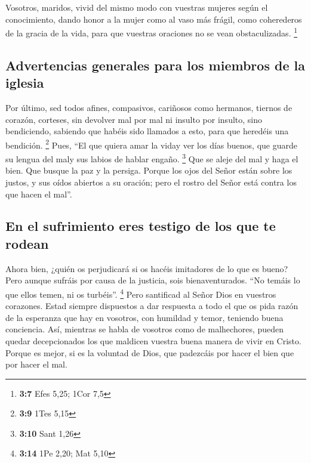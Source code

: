 \begin{paracol}{2}
 Vosotros, maridos, vivid del mismo modo con vuestras
mujeres según el conocimiento, dando honor a la mujer como al vaso más
frágil, como coherederos de la gracia de la vida, para que vuestras
oraciones no se vean obstaculizadas. \footnote{\textbf{3:7} Efes 5,25;
  1Cor 7,5}

\hypertarget{advertencias-generales-para-los-miembros-de-la-iglesia}{%
\subsection{Advertencias generales para los miembros de la
iglesia}\label{advertencias-generales-para-los-miembros-de-la-iglesia}}

 Por último, sed todos afines, compasivos, cariñosos como
hermanos, tiernos de corazón, corteses,  sin devolver mal
por mal ni insulto por insulto, sino bendiciendo, sabiendo que habéis
sido llamados a esto, para que heredéis una bendición. \footnote{\textbf{3:9}
  1Tes 5,15}  Pues, ``El que quiera amar la viday ver los
días buenos, que guarde su lengua del maly sus labios de hablar engaño.
\footnote{\textbf{3:10} Sant 1,26}  Que se aleje del mal
y haga el bien. Que busque la paz y la persiga.  Porque
los ojos del Señor están sobre los justos, y sus oídos abiertos a su
oración; pero el rostro del Señor está contra los que hacen el mal''.

\hypertarget{en-el-sufrimiento-eres-testigo-de-los-que-te-rodean}{%
\subsection{En el sufrimiento eres testigo de los que te
rodean}\label{en-el-sufrimiento-eres-testigo-de-los-que-te-rodean}}

 Ahora bien, ¿quién os perjudicará si os hacéis
imitadores de lo que es bueno?  Pero aunque sufráis por
causa de la justicia, sois bienaventurados. ``No temáis lo que ellos
temen, ni os turbéis''. \footnote{\textbf{3:14} 1Pe 2,20; Mat 5,10}
 Pero santificad al Señor Dios en vuestros corazones.
Estad siempre dispuestos a dar respuesta a todo el que os pida razón de
la esperanza que hay en vosotros, con humildad y temor, 
teniendo buena conciencia. Así, mientras se habla de vosotros como de
malhechores, pueden quedar decepcionados los que maldicen vuestra buena
manera de vivir en Cristo.  Porque es mejor, si es la
voluntad de Dios, que padezcáis por hacer el bien que por hacer el mal.


\end{paracol}
